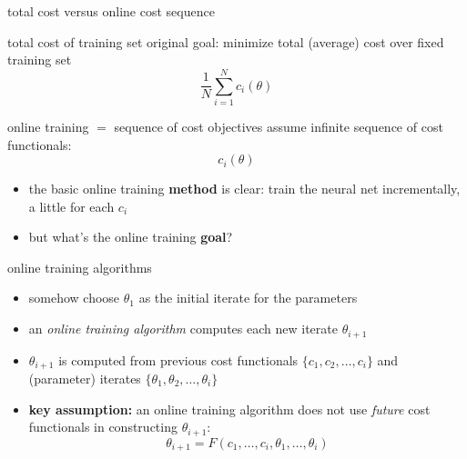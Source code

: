 \documentclass[xcolor={svgnames},
               hyperref={colorlinks,citecolor=DeepPink4,linkcolor=FireBrick,urlcolor=Maroon}]
               {beamer}
\begin{document}
\begin{frame}{total cost versus online cost sequence}

\begin{block}{total cost of training set}
original goal:  minimize total (average) cost over fixed training set
    $$\frac{1}{N} \sum_{i=1}^N c_i(\theta)$$
\end{block}

\begin{block}{online training $=$ sequence of cost objectives}
assume infinite sequence of cost functionals:
    $$c_i(\theta)$$
\end{block}

\begin{itemize}
\item the basic online training \textbf{method} is clear: train the neural net incrementally, a little for each $c_i$
\item but what's the online training \textbf{goal}?
\end{itemize}

\end{frame}


\begin{frame}{online training algorithms}

\begin{itemize}
\item somehow choose $\theta_1$ as the initial iterate for the parameters
\item an \emph{online training algorithm} computes each new iterate $\theta_{i+1}$
\item $\theta_{i+1}$ is computed from previous cost functionals $\{c_1,c_2,\dots,c_i\}$ and (parameter) iterates $\{\theta_1,\theta_2,\dots,\theta_i\}$
\item \textbf{key assumption:} an online  training algorithm does not use \emph{future} cost functionals in constructing $\theta_{i+1}$:
    $$\theta_{i+1} = F(c_1,\dots,c_i,\theta_1,\dots,\theta_i)$$
\end{itemize}
\end{frame}
\end{document}
